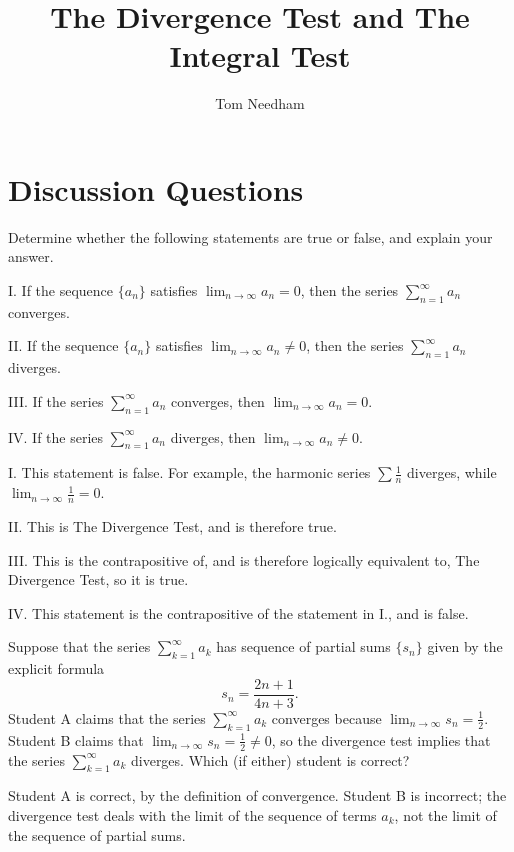 \documentclass[]{ximera}
\author{Tom Needham}
\title[]{The Divergence Test and The Integral Test}
\begin{document}
\begin{abstract}
\end{abstract}
\maketitle

\vspace{-0.9in}

\section{Discussion Questions}

\begin{problem}
Determine whether the following statements are true or false, and explain your answer.

I. If the sequence $\{a_n\}$ satisfies $\lim_{n\rightarrow \infty} a_n = 0$, then the series $\sum_{n=1}^\infty a_n$ converges.

II. If the sequence $\{a_n\}$ satisfies $\lim_{n \rightarrow \infty} a_n \neq 0$, then the series $\sum_{n=1}^\infty a_n$ diverges.

III. If the series $\sum_{n=1}^\infty a_n$ converges, then $\lim_{n\rightarrow \infty} a_n = 0$. 

IV. If the series $\sum_{n=1}^\infty a_n$ diverges, then $\lim_{n\rightarrow \infty} a_n \neq 0$. 

\begin{solution}
I. This statement is false. For example, the harmonic series $\sum \frac{1}{n}$ diverges, while $\lim_{n \rightarrow \infty} \frac{1}{n} = 0$. 

II. This is The Divergence Test, and is therefore true.

III. This is the contrapositive of, and is therefore logically equivalent to, The Divergence Test, so it is true.

IV. This statement is the contrapositive of the statement in I., and is false.
\end{solution}

\end{problem}


\begin{problem}
Suppose that the series $\sum_{k=1}^\infty a_k$ has sequence of partial sums $\{s_n\}$ given by the explicit formula
$$
s_n = \frac{2n+1}{4n+3}.
$$
Student A claims that the series $\sum_{k=1}^\infty a_k$ converges because $\lim_{n \rightarrow \infty} s_n = \frac{1}{2}$. Student B claims that $\lim_{n\rightarrow \infty} s_n = \frac{1}{2} \neq 0$, so the divergence test implies that the series $\sum_{k=1}^\infty a_k$ diverges. Which (if either) student is correct?

\begin{solution}
Student A is correct, by the definition of convergence. Student B is incorrect; the divergence test deals with the limit of the sequence of  terms $a_k$, not the limit of the sequence of partial sums.
\end{solution}
\end{problem}
\end{document}
